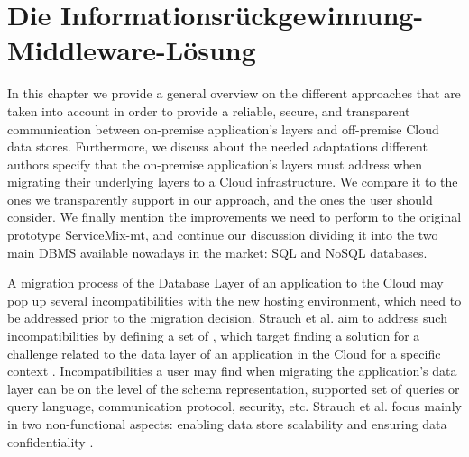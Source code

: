 \chapter{Die Informationsrückgewinnung-Middleware-Lösung}
\label{chap:BD4B}

In this chapter we provide a general overview on the different approaches that are taken into account in order to provide a reliable, secure, and transparent communication between on-premise application's layers and off-premise Cloud data stores. Furthermore, we discuss about the needed adaptations different authors specify that the on-premise application's layers must address when migrating their underlying layers to a Cloud infrastructure. We compare it to the ones we transparently support in our approach, and the ones the user should consider. We finally mention the improvements we need to perform to the original prototype ServiceMix-mt, and continue our discussion dividing it into the two main \ac{DBMS} available nowadays in the market: \ac{SQL} and \ac{NoSQL} databases.

A migration process of the Database Layer of an application to the Cloud may pop up several incompatibilities with the new hosting environment, which need to be addressed prior to the migration decision. Strauch et al. aim to address such incompatibilities by defining a set of , which target finding a solution for a challenge related to the data layer of an application in the Cloud for a specific context \cite{strauchABKL2012}. Incompatibilities a user may find when migrating the application's data layer can be on the level of the schema representation, supported set of queries or query language, communication protocol, security, etc. Strauch et al. focus mainly in two non-functional aspects: enabling data store scalability and ensuring data confidentiality \cite{strauchABKL2012}. 


